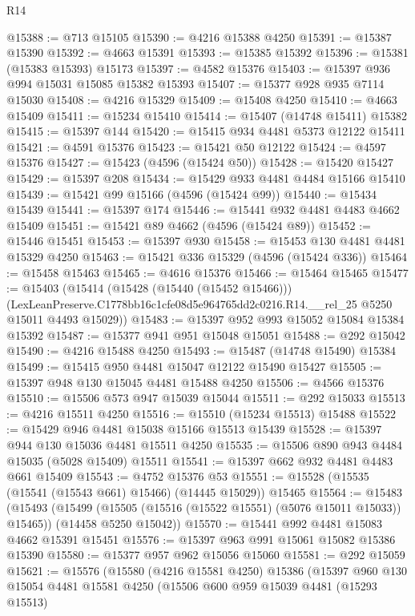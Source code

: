 \begin{lexlean}{R14}
\begin{coremodule}
@15388 := @713 @15105
@15390 := @4216 @15388 @4250
@15391 := @15387 @15390
@15392 := @4663 @15391
@15393 := @15385 @15392
@15396 := @15381 (@15383 @15393) @15173
@15397 := @4582 @15376
@15403 := @15397 @936 @994 @15031 @15085 @15382 @15393
@15407 := @15377 @928 @935 @7114 @15030
@15408 := @4216 @15329
@15409 := @15408 @4250
@15410 := @4663 @15409
@15411 := @15234 @15410
@15414 := @15407 (@14748 @15411) @15382
@15415 := @15397 @144
@15420 := @15415 @934 @4481 @5373 @12122 @15411
@15421 := @4591 @15376
@15423 := @15421 @50 @12122
@15424 := @4597 @15376
@15427 := @15423 (@4596 (@15424 @50))
@15428 := @15420 @15427
@15429 := @15397 @208
@15434 := @15429 @933 @4481 @4484 @15166 @15410
@15439 := @15421 @99 @15166 (@4596 (@15424 @99))
@15440 := @15434 @15439
@15441 := @15397 @174
@15446 := @15441 @932 @4481 @4483 @4662 @15409
@15451 := @15421 @89 @4662 (@4596 (@15424 @89))
@15452 := @15446 @15451
@15453 := @15397 @930
@15458 := @15453 @130 @4481 @4481 @15329 @4250
@15463 := @15421 @336 @15329 (@4596 (@15424 @336))
@15464 := @15458 @15463
@15465 := @4616 @15376
@15466 := @15464 @15465
@15477 := @15403
    (@15414
      (@15428 (@15440 (@15452 @15466)))
      (LexLeanPreserve.C1778bb16c1cfe08d5e964765dd2c0216.R14.__rel_25 @5250 @15011 @4493 @15029))
@15483 := @15397 @952 @993 @15052 @15084 @15384 @15392
@15487 := @15377 @941 @951 @15048 @15051
@15488 := @292 @15042
@15490 := @4216 @15488 @4250
@15493 := @15487 (@14748 @15490) @15384
@15499 := @15415 @950 @4481 @15047 @12122 @15490 @15427
@15505 := @15397 @948 @130 @15045 @4481 @15488 @4250
@15506 := @4566 @15376
@15510 := @15506 @573 @947 @15039 @15044
@15511 := @292 @15033
@15513 := @4216 @15511 @4250
@15516 := @15510 (@15234 @15513) @15488
@15522 := @15429 @946 @4481 @15038 @15166 @15513 @15439
@15528 := @15397 @944 @130 @15036 @4481 @15511 @4250
@15535 := @15506 @890 @943 @4484 @15035 (@5028 @15409) @15511
@15541 := @15397 @662 @932 @4481 @4483 @661 @15409
@15543 := @4752 @15376 @53
@15551 := @15528 (@15535 (@15541 (@15543 @661) @15466) (@14445 @15029)) @15465
@15564 := @15483
    (@15493
      (@15499 (@15505 (@15516 (@15522 @15551) (@5076 @15011 @15033)) @15465))
      (@14458 @5250 @15042))
@15570 := @15441 @992 @4481 @15083 @4662 @15391 @15451
@15576 := @15397 @963 @991 @15061 @15082 @15386 @15390
@15580 := @15377 @957 @962 @15056 @15060
@15581 := @292 @15059
@15621 := @15576
    (@15580
      (@4216 @15581 @4250)
      @15386
      (@15397
        @960
        @130
        @15054
        @4481
        @15581
        @4250
        (@15506
          @600
          @959
          @15039
          @4481
          (@15293 @15513)

\end{coremodule}
\end{lexlean}
